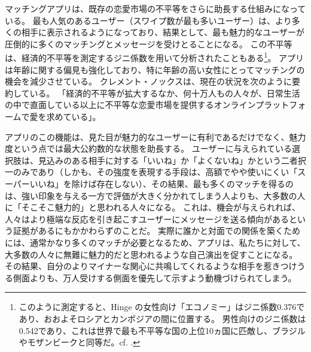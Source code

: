 \documentclass[paper=a4,book,openany]{jlreq}
\begin{document}
マッチングアプリは、既存の恋愛市場の不平等をさらに助長する仕組みになっている。
最も人気のあるユーザー（スワイプ数が最も多いユーザー）は、より多くの相手に表示されるようになっており、結果として、最も魅力的なユーザーが圧倒的に多くのマッチングとメッセージを受けとることになる\citep{carr16:_i_foun_out}。
この不平等は、経済的不平等を測定するジニ係数を用いて分析されたこともある\footnote{このように測定すると、Hinge の女性向け「エコノミー」はジニ係数0.376であり、おおよそロシアとカンボジアの間に位置する。
男性向けのジニ係数は0.542であり、これは世界で最も不平等な国の上位10ヵ国に匹敵し、ブラジルやモザンビークと同等だ。cf. \citet{kopf17:_these_statis_show_why_its}.}。
アプリは年齢に関する偏見も強化しており、特に年齢の高い女性にとってマッチングの機会を減少させている\citep{schrobsdorff21:_paulin_poriz}。
クレメント・ノックスは、現在の状況を次のように要約している。
「経済的不平等が拡大するなか、何十万人もの人々が、日常生活の中で直面している以上に不平等な恋愛市場を提供するオンラインプラットフォームで愛を求めている」\citep[p.408]{clement20:_seduc}。

アプリのこの機能は、見た目が魅力的なユーザーに有利であるだけでなく、魅力度という点では最大公約数的な状態を助長する。
ユーザーに与えられている選択肢は、見込みのある相手に対する「いいね」か「よくないね」かという二者択一のみであり（しかも、その強度を表現する手段は、高額でやや使いにくい「スーパーいいね」を除けば存在しない）、その結果、最も多くのマッチを得るのは、強い印象を与える一方で評価が大きく分かれてしまう人よりも、大多数の人に「そこそこ魅力的」と思われる人々になる。
これは、機会が与えられれば、人々はより極端な反応を引き起こすユーザーにメッセージを送る傾向があるという証拠があるにもかかわらずのことだ\citep{rudder11:_mathem_beaut}。
実際に誰かと対面での関係を築くためには、通常かなり多くのマッチが必要となるため、アプリは、私たちに対して、大多数の人々に無難に魅力的だと思われるような自己演出を促すことになる。
その結果、自分のよりマイナーな関心に共鳴してくれるような相手を惹きつけうる側面よりも、万人受けする側面を優先して示すよう動機づけられてしまう。
\end{document}
